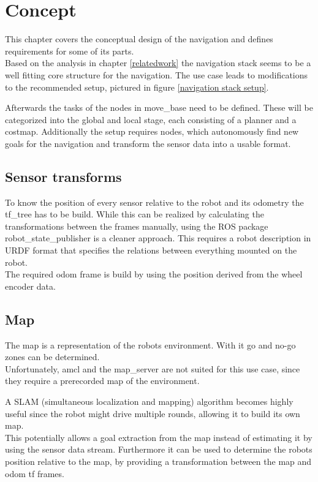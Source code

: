 \chapter{Concept}
\label{Concept}

This chapter covers the conceptual design of the navigation and defines requirements for some of its parts.\\

Based on the analysis in chapter \ref{relatedwork} the navigation stack seems to be a well fitting core structure for the navigation. The use case leads to modifications to the recommended setup, pictured in figure \ref{navigation stack setup}.

Afterwards the tasks of the nodes in move\_base need to be defined. These will be categorized into the global and local stage, each consisting of a planner and a costmap.
Additionally the setup requires nodes, which autonomously find new goals for the navigation and transform the sensor data into a usable format. 

\section{Sensor transforms}
To know the position of every sensor relative to the robot and its odometry the tf\_tree has to be build. While this can be realized by calculating the transformations between the frames manually,  using the ROS package robot\_state\_publisher is a cleaner approach. This requires a robot description in URDF format that specifies the relations between everything mounted on the robot.\\

The required odom frame is build by using the position derived from the wheel encoder data.

\section{Map}

The map is a representation of the robots environment. With it go and no-go zones can be determined.\\

Unfortunately, amcl and the map\_server are not suited for this use case, since they require a prerecorded map of the environment. 

A SLAM (simultaneous localization and mapping) algorithm becomes highly useful since the robot might drive multiple rounds, allowing it to build its own map.\\
This potentially allows a goal extraction from the map instead of estimating it by using the sensor data stream. Furthermore it can be used to determine the robots position relative to the map, by providing a transformation between the map and odom tf frames.

